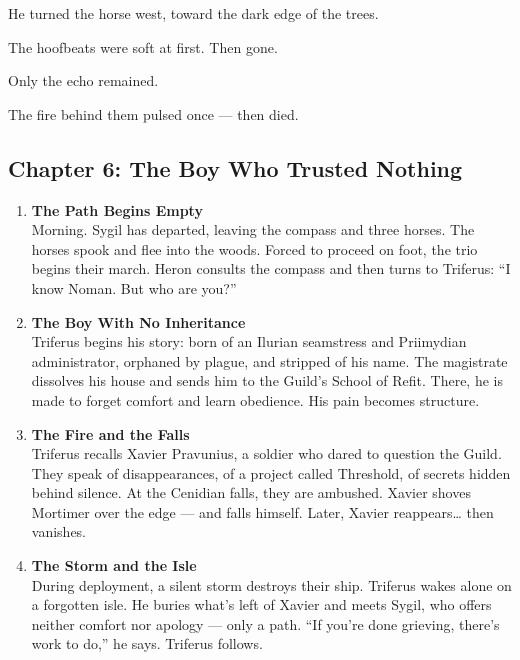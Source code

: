 \documentclass[9pt]{article}
\begin{document}
\vspace{1em}

He turned the horse west, toward the dark edge of the trees.

The hoofbeats were soft at first. Then gone.

Only the echo remained.

The fire behind them pulsed once — then died.

\newpage

\subsection*{Chapter 6: The Boy Who Trusted Nothing}

\vspace{1in}

\begin{center}
\begin{enumerate}
\item \textbf{The Path Begins Empty} \\
Morning. Sygil has departed, leaving the compass and three horses. The horses spook and flee into the woods. Forced to proceed on foot, the trio begins their march. Heron consults the compass and then turns to Triferus: “I know Noman. But who are you?”

\vspace{.3in}
\item \textbf{The Boy With No Inheritance} \\
Triferus begins his story: born of an Ilurian seamstress and Priimydian administrator, orphaned by plague, and stripped of his name. The magistrate dissolves his house and sends him to the Guild’s School of Refit. There, he is made to forget comfort and learn obedience. His pain becomes structure.

\vspace{.3in}
\item \textbf{The Fire and the Falls} \\
Triferus recalls Xavier Pravunius, a soldier who dared to question the Guild. They speak of disappearances, of a project called Threshold, of secrets hidden behind silence. At the Cenidian falls, they are ambushed. Xavier shoves Mortimer over the edge — and falls himself. Later, Xavier reappears… then vanishes.

\vspace{.3in}
\item \textbf{The Storm and the Isle} \\
During deployment, a silent storm destroys their ship. Triferus wakes alone on a forgotten isle. He buries what’s left of Xavier and meets Sygil, who offers neither comfort nor apology — only a path. “If you’re done grieving, there’s work to do,” he says. Triferus follows.


\end{enumerate}
\end{center}
\end{document}
